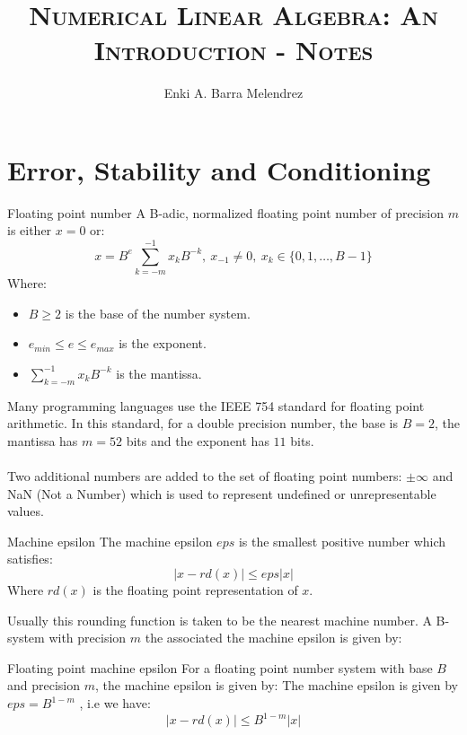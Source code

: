 \documentclass[12pt,a4paper]{book}
\title{\textsc{Numerical Linear Algebra: An Introduction - Notes}}
\author{Enki A. Barra Melendrez}
\date{}
\newcommand {\1}{\textrm{\textbf{1}}}
\begin{document}
\maketitle
\setcounter{section}{1}
\section{Error, Stability and Conditioning}

\begin{definition}{Floating point number}
    A B-adic, normalized floating point number of precision $m$ is either $x=0$ or:
    \begin{equation*}
        x = B^e \sum_{k=-m}^{-1} x_k B^{-k}, \ x_{-1} \neq 0, \ x_k \in \{0,1,\ldots,B-1\}
    \end{equation*}
    Where: 
    \begin{itemize}
        \item $B \geq 2$ is the base of the number system.
        \item $e_{min} \leq e \leq e_{max}$ is the exponent.
        \item $\sum_{k=-m}^{-1} x_k B^{-k}$ is the mantissa.
    \end{itemize}
\end{definition}

\noindent Many programming languages use the IEEE 754 standard for floating point arithmetic. In this standard, for a double precision number, the base is $B=2$, the mantissa has $m=52$ bits and the exponent has $11$ bits.\\
\\
\noindent Two additional numbers are added to the set of floating point numbers: $\pm \infty$ and NaN (Not a Number) which is used to represent undefined or unrepresentable values.\\

\begin{definition}{Machine epsilon}
    The machine epsilon $eps$ is the smallest positive number which satisfies:
    \[
       | x -rd(x) | \leq eps | x |
    \]
    Where $rd(x)$ is the floating point representation of $x$. 
\end{definition}
\noindent Usually this rounding function is taken to be the nearest machine number. A B-system with precision $m$ the associated the machine epsilon is given by:\\
\begin{theorem}{Floating point machine epsilon}
    For a floating point number system with base $B$ and precision $m$, the machine epsilon is given by:
    The machine epsilon is given by $eps = B^{1-m}$ , i.e we have: 
    \[
        | x -rd(x) | \leq B^{1-m} | x |
    \]
\end{theorem}
\end{document}

